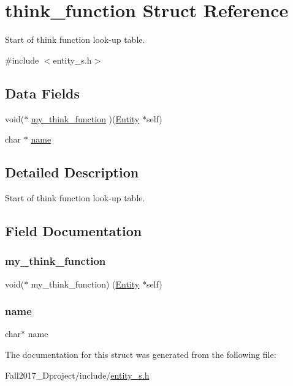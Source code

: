 \hypertarget{structthink__function}{}\section{think\+\_\+function Struct Reference}
\label{structthink__function}


Start of think function look-\/up table.  




{\ttfamily \#include $<$entity\+\_\+s.\+h$>$}

\subsection*{Data Fields}
\begin{DoxyCompactItemize}
\item 
void($\ast$ \hyperlink{structthink__function_a7bbc48756692dbd8c333f59227442834}{my\+\_\+think\+\_\+function} )(\hyperlink{entity__s_8h_a603076735282b0b83df7e6ecd290f875}{Entity} $\ast$self)
\item 
char $\ast$ \hyperlink{structthink__function_a5ac083a645d964373f022d03df4849c8}{name}
\end{DoxyCompactItemize}


\subsection{Detailed Description}
Start of think function look-\/up table. 

\subsection{Field Documentation}
\mbox{\label{structthink__function_a7bbc48756692dbd8c333f59227442834}} 
\subsubsection{\texorpdfstring{my\+\_\+think\+\_\+function}{my\_think\_function}}
{\footnotesize\ttfamily void($\ast$ my\+\_\+think\+\_\+function) (\hyperlink{entity__s_8h_a603076735282b0b83df7e6ecd290f875}{Entity} $\ast$self)}

\mbox{\label{structthink__function_a5ac083a645d964373f022d03df4849c8}} 
\subsubsection{\texorpdfstring{name}{name}}
{\footnotesize\ttfamily char$\ast$ name}



The documentation for this struct was generated from the following file\+:\begin{DoxyCompactItemize}
\item 
Fall2017\+\_\+Dproject/include/\hyperlink{entity__s_8h}{entity\+\_\+s.\+h}\end{DoxyCompactItemize}
